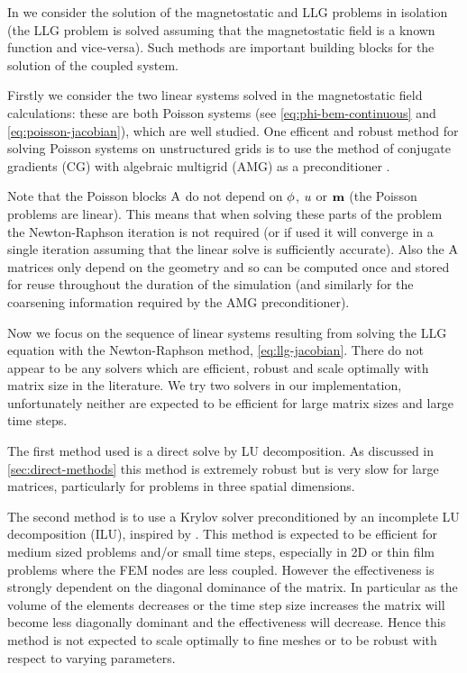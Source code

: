 In  we consider the solution of the magnetostatic and LLG problems in isolation (\ie the LLG problem is solved assuming that the magnetostatic field is a known function and vice-versa).
Such methods are important building blocks for the solution of the coupled system.

Firstly we consider the two linear systems solved in the magnetostatic field calculations: these are both Poisson systems (see \cref{eq:phi-bem-continuous} and \cref{eq:poisson-jacobian}), which are well studied.
One efficent and robust method for solving Poisson systems on unstructured grids is to use the method of conjugate gradients (CG) with algebraic multigrid (AMG) as a preconditioner \cite{Henson2002}.

Note that the Poisson blocks $\mathrm{A}$ do not depend on $\phi$, $u$ or $\boldsymbol{\mathrm{m}}$ (\ie the Poisson problems are linear).
This means that when solving these parts of the problem the Newton-Raphson iteration is not required (or if used it will converge in a single iteration assuming that the linear solve is sufficiently accurate).
Also the $\mathrm{A}$ matrices only depend on the geometry and so can be computed once and stored for reuse throughout the duration of the simulation (and similarly for the coarsening information required by the AMG preconditioner).


Now we focus on the sequence of linear systems resulting from solving the LLG equation with the Newton-Raphson method, \cref{eq:llg-jacobian}.
There do not appear to be any solvers which are efficient, robust and scale optimally with matrix size in the literature.
We try two solvers in our implementation, unfortunately neither are expected to be efficient for large matrix sizes and large time steps.

The first method used is a direct solve by LU decomposition.
As discussed in \cref{sec:direct-methods} this method is extremely robust but is very slow for large matrices, particularly for problems in three spatial dimensions.

The second method is to use a Krylov solver preconditioned by an incomplete LU decomposition (ILU), inspired by \cite{Suess2002}.
This method is expected to be efficient for medium sized problems and/or small time steps, especially in 2D or thin film problems where the FEM nodes are less coupled.
However the effectiveness is strongly dependent on the diagonal dominance of the matrix.
In particular as the volume of the elements decreases or the time step size increases the matrix will become less diagonally dominant and the effectiveness will decrease.
Hence this method is not expected to scale optimally to fine meshes or to be robust with respect to varying parameters.

